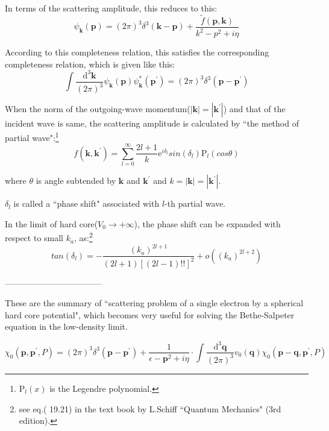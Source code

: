 In terms of the scattering amplitude, this reduces to this:
\begin{equation*} \label{Eqs2.7.A.7'} \tag{2.7.A.7'}
\psi_{\mathbf{k}} (\mathbf{p}) = (2\pi)^3 \delta^3(\mathbf{k}-\mathbf{p}) + \frac{\tilde{f}(\mathbf{p},\mathbf{k})}{k^2-p^2+i \eta}
\end{equation*}

According to this completeness relation, this satisfies the corresponding completeness relation, which is given like this:
\begin{equation*} \label{Eqs2.7.A.9} \tag{2.7.A.9}
\int \frac{\mathrm{d}^3 \mathbf{k}}{(2\pi)^3} \psi_{\mathbf{k}}(\mathbf{p}) \psi_{\mathbf{k}}^* (\mathbf{p}^{'}) = (2\pi) ^3 \delta^3 (\mathbf{p} - \mathbf{p}^{'})
\end{equation*}

When the norm of the outgoing-wave momentum($|\mathbf{k}| = |\mathbf{k}^{'}|$) and that of the incident wave is same, the scattering amplitude is calculated by ``the method of partial wave":\footnote{$\mathrm{P}_l(x)$ is the Legendre polynomial.}
\begin{equation*} \label{Eqs2.7.A.10} \tag{2.7.A.10}
f(\mathbf{k},\mathbf{k}^{'}) = \sum_{l=0}^{\infty} \frac{2l+1}{k} \mathrm{e}^{i \delta_l} sin(\delta_l) \mathrm{P}_l (cos\theta)
\end{equation*}

where $\theta$ is angle subtended by $\mathbf{k}$ and $\mathbf{k}^{'}$ and $k = |\mathbf{k}| = |\mathbf{k}^{'}|$.

$\delta_l$ is called a ``phase shift" associated with $l$-th partial wave.

In the limit of hard core($V_0 \rightarrow +\infty$), the phase shift can be expanded with respect to small $k_a$, as:\footnote{see eq.( 19.21) in the text book by L.Schiff ``Quantum Mechanics" (3rd edition).}
\begin{equation*} \label{Eqs2.7.A.11} \tag{2.7.A.11}
tan(\delta_l) = - \frac{(k_a)^{2l+1}}{(2l+1)[(2l-1)!!]^2} + o((k_a)^{2l+2})\end{equation*}

\begin{center}-----------------------------------\end{center}

These are the summary of ``scattering problem of a single electron by a spherical hard core potential", which becomes very useful for solving the Bethe-Salpeter equation in the low-density limit.

\begin{equation*}  \tag{2.7.18'}
\chi_0(\mathbf{p},\mathbf{p}^{'},P) = (2\pi)^3\delta^3(\mathbf{p}-\mathbf{p}^{'}) + \frac{1}{\epsilon-\mathbf{p}^2+i\eta}\cdot\int\frac{\mathrm{d}^3\mathbf{q}}{(2\pi)^3}v_0(\mathbf{q}) \chi_0(\mathbf{p}-\mathbf{q},\mathbf{p}^{'},P)
\end{equation*}

